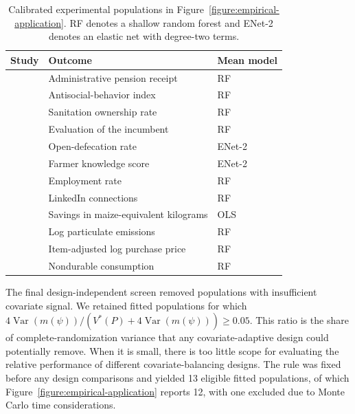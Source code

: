 \documentclass[letterpaper,12pt]{article}
\theoremstyle{definition}
\numberwithin{equation}{section}
\DeclareMathOperator{\var}{Var}
\begin{document}
\begin{table}[!t]
\centering
\caption{Calibrated experimental populations in Figure~\ref{figure:empirical-application}. RF denotes a shallow random forest and ENet-2 denotes an elastic net with degree-two terms.}
\label{table:empirical-populations}
\small
\singlespacing
\begin{tabular}{@{}lll@{}}
\toprule
Study & Outcome & Mean model \\
\midrule
\citet{gupta2026paperwork} & Administrative pension receipt & RF \\
\citet{blattman2023cbt} & Antisocial-behavior index & RF \\
\citet{gautam2025sanitation} & Sanitation ownership rate & RF \\
\citet{bhandari2023able} & Evaluation of the incumbent & RF \\
\citet{augsburg2022nature} & Open-defecation rate & ENet-2 \\
\citet{benyishay2020gender} & Farmer knowledge score & ENet-2 \\
\citet{beam2016job} & Employment rate & RF \\
\citet{evsyukova2025linkedout} & LinkedIn connections & RF \\
\citet{augenblick2026retrieval} & Savings in maize-equivalent kilograms & OLS \\
\citet{greenstone2025pollution} & Log particulate emissions & RF \\
\citet{bandiera2021authority} & Item-adjusted log purchase price & RF \\
\citet{haushofer2016transfers} & Nondurable consumption & RF \\
\bottomrule
\end{tabular}
\end{table}


The final design-independent screen removed populations with insufficient covariate signal.
We retained fitted populations for which $4\var(m(\psi))/(V^*(P)+4\var(m(\psi)))\geq0.05$.
This ratio is the share of complete-randomization variance that any covariate-adaptive design could potentially remove.
When it is small, there is too little scope for evaluating the relative performance of different covariate-balancing designs.
The rule was fixed before any design comparisons and yielded 13 eligible fitted populations, of which Figure~\ref{figure:empirical-application} reports 12, with one excluded due to Monte Carlo time considerations.

\FloatBarrier
\end{document}

